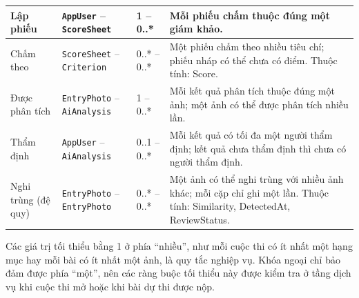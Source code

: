 \begin{longtable}{|L{2.5cm}|L{3.5cm}|L{1.9cm}|L{6.1cm}|}
Lập phiếu & \texttt{AppUser} -- \texttt{ScoreSheet} & 1 -- 0..* & Mỗi phiếu chấm thuộc đúng một giám khảo. \\ \hline
Chấm theo & \texttt{ScoreSheet} -- \texttt{Criterion} & 0..* -- 0..* & Một phiếu chấm theo nhiều tiêu chí; phiếu nháp có thể chưa có điểm. Thuộc tính: Score. \\ \hline
Được phân tích & \texttt{EntryPhoto} -- \texttt{AiAnalysis} & 1 -- 0..* & Mỗi kết quả phân tích thuộc đúng một ảnh; một ảnh có thể được phân tích nhiều lần. \\ \hline
Thẩm định & \texttt{AppUser} -- \texttt{AiAnalysis} & 0..1 -- 0..* & Mỗi kết quả có tối đa một người thẩm định; kết quả chưa thẩm định thì chưa có người thẩm định. \\ \hline
Nghi trùng (đệ quy) & \texttt{EntryPhoto} -- \texttt{EntryPhoto} & 0..* -- 0..* & Một ảnh có thể nghi trùng với nhiều ảnh khác; mỗi cặp chỉ ghi một lần. Thuộc tính: Similarity, DetectedAt, ReviewStatus. \\ \hline
\end{longtable}

Các giá trị tối thiểu bằng 1 ở phía \textquotedblleft nhiều\textquotedblright{}, như mỗi cuộc thi có ít nhất một hạng mục hay mỗi bài có ít nhất một ảnh, là quy tắc nghiệp vụ. Khóa ngoại chỉ bảo đảm được phía \textquotedblleft một\textquotedblright{}, nên các ràng buộc tối thiểu này được kiểm tra ở tầng dịch vụ khi cuộc thi mở hoặc khi bài dự thi được nộp.
